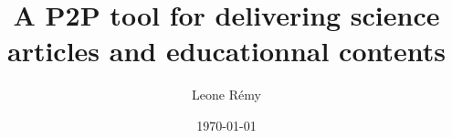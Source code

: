 \author{Leone Rémy}
\title{A P2P tool for delivering science articles and educationnal contents}
\date{\today}
